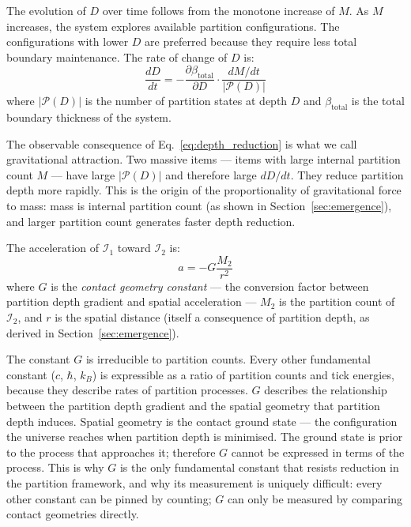 The evolution of $D$ over time follows from the monotone increase of $M$. As
$M$ increases, the system explores available partition configurations. The
configurations with lower $D$ are preferred because they require less total
boundary maintenance. The rate of change of $D$ is:
\begin{equation}
    \frac{dD}{dt} = -\frac{\partial \beta_{\mathrm{total}}}{\partial D} \cdot
    \frac{dM/dt}{|\mathcal{P}(D)|}
    \label{eq:depth_reduction}
\end{equation}
where $|\mathcal{P}(D)|$ is the number of partition states at depth $D$ and
$\beta_{\mathrm{total}}$ is the total boundary thickness of the system.

The observable consequence of Eq.~\eqref{eq:depth_reduction} is what we call
gravitational attraction. Two massive items --- items with large internal
partition count $M$ --- have large $|\mathcal{P}(D)|$ and therefore large
$dD/dt$. They reduce partition depth more rapidly. This is the origin of the
proportionality of gravitational force to mass: mass is internal partition count
(as shown in Section~\ref{sec:emergence}), and larger partition count generates
faster depth reduction.

\begin{theorem}
\label{thm:gravity}
The acceleration of $\mathcal{I}_1$ toward $\mathcal{I}_2$ is:
\begin{equation}
    a = -G \frac{M_2}{r^2}
    \label{eq:gravity}
\end{equation}
where $G$ is the \emph{contact geometry constant} --- the conversion factor
between partition depth gradient and spatial acceleration --- $M_2$ is the
partition count of $\mathcal{I}_2$, and $r$ is the spatial distance
(itself a consequence of partition depth, as derived in
Section~\ref{sec:emergence}).
\end{theorem}

\begin{remark}
\label{rem:G_irreducible}
The constant $G$ is irreducible to partition counts. Every other fundamental
constant ($c$, $\hbar$, $k_B$) is expressible as a ratio of partition counts
and tick energies, because they describe rates of partition processes. $G$
describes the relationship between the partition depth gradient and the spatial
geometry that partition depth induces. Spatial geometry is the contact ground
state --- the configuration the universe reaches when partition depth is
minimised. The ground state is prior to the process that approaches it; therefore
$G$ cannot be expressed in terms of the process. This is why $G$ is the only
fundamental constant that resists reduction in the partition framework, and why
its measurement is uniquely difficult: every other constant can be pinned by
counting; $G$ can only be measured by comparing contact geometries directly.
\end{remark}

